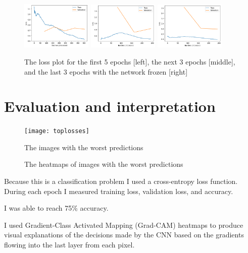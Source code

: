 \documentclass[12pt,letterpaper]{hmcpset}
\begin{document}
\begin{figure}
    \centering
    \includegraphics[width=0.3\textwidth]{loss1}
    \includegraphics[width=0.3\textwidth]{loss2}
    \includegraphics[width=0.3\textwidth]{loss3}
    \caption{The loss plot for the first 5 epochs [left], the next 3 epochs [middle], and the last 3 epochs with the network frozen [right]}
\end{figure}
\section{Evaluation and interpretation}
\begin{figure}
    \texttt{[image: toplosses]}
    \caption{The images with the worst predictions}
\end{figure}
\begin{figure}
    \caption{The heatmaps of images with the worst predictions}
\end{figure}
\begin{figure}
\end{figure}
Because this is a classification problem I used a cross-entropy loss function.
During each epoch I measured training loss, validation loss, and accuracy.

I was able to reach 75\% accuracy.

I used Gradient-Class Activated Mapping (Grad-CAM) heatmaps to produce visual explanations of the decisions made by the CNN based on the gradients flowing into the last layer from each pixel.
\end{document}
